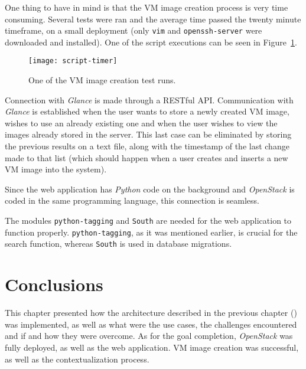 One thing to have in mind is that the VM image creation process is very time consuming. Several tests were ran and the average time passed the twenty minute timeframe, on a small deployment (only \texttt{vim} and \texttt{openssh-server} were downloaded and installed). One of the script executions can be seen in Figure~\ref{fig:script-timer}.

\begin{figure}[h]
  \begin{center}
    \leavevmode
    \texttt{[image: script-timer]}
    \caption{One of the VM image creation test runs.}
    \label{fig:script-timer}
  \end{center}
\end{figure}

Connection with \textit{Glance} is made through a RESTful API. Communication with \textit{Glance} is established when the user wants to store a newly created VM image, wishes to use an already existing one and when the user wishes to view the images already stored in the server. This last case can be eliminated by storing the previous results on a text file, along with the timestamp of the last change made to that list (which should happen when a user creates and inserts a new VM image into the system).

Since the web application has \textit{Python} code on the background and \textit{OpenStack} is coded in the same programming language, this connection is seamless.

The modules \texttt{python-tagging} and \texttt{South} are needed for the web application to function properly. \texttt{python-tagging}, as it was mentioned earlier, is crucial for the search function, whereas \texttt{South} is used in database migrations.
\section{Conclusions}

This chapter presented how the architecture described in the previous chapter () was implemented, as well as what were the use cases, the challenges encountered and if and how they were overcome. 
As for the goal completion, \textit{OpenStack} was fully deployed, as well as the web application. VM image creation was successful, as well as the contextualization process.
